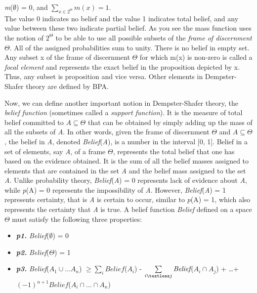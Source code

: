 \documentclass[11pt]{article}
\begin{document}
\textit{m}($\emptyset$) = 0, and $\sum\limits_{x\in2^\Theta}m(x) =1$.\\

The value 0 indicates no belief and the value 1 indicates total belief, and
any value between these two indicate partial belief. As you see the mass
function uses the notion of $2^\Theta$ to be able to use all possible subsets of
the \textit{frame of discernment} $\Theta$. All of the assigned probabilities
sum to unity. There is no belief in empty set. Any subset x of the frame of
discernment $\Theta$ for which m(x) is non-zero is called a \textit{focal
element} and represents the exact belief in the proposition depicted by x. Thus,
any subset is proposition and vice versa. Other elements in Dempster-Shafer
theory are defined by BPA. 

Now, we can define another important notion in Dempster-Shafer theory, the
\textit{belief function} (sometimes called a \textit{support function}). It is
the measure of total belief committed to $A \subseteq \Theta$ that can be
obtained by simply adding up the mass of all the subsets of \textit{A}. In other
words, given the frame of discernment $\Theta$ and $A \subseteq \Theta$, the
belief in \textit{A}, denoted \textit{Belief}(\textit{A}), is a number in the
interval [0, 1]. Belief in a set of elements, say \textit{A}, of a frame
$\Theta$, represents the total belief that one has based on the evidence
obtained. It is the sum of all the belief masses assigned to elements that are
contained in the set \textit{A} and the belief mass assigned to the set
\textit{A}. Unlike probability theory, \textit{Belief}(\textit{A}) = 0
represents lack of evidence about \textit{A}, while \textit{p}(A) = 0 represents
the impossibility of \textit{A}. However, \textit{Belief}(\textit{A}) = 1
represents certainty, that is \textit{A} is certain to occur, similar to
\textit{p}(A) = 1, which also represents the certainty that \textit{A} is true.
A belief function \textit{Belief} defined on a space $\Theta$ must satisfy the
following three properties:

\begin{itemize}
	\item[]\textit{\textbf{p1.}} \textit{Belief}($\emptyset$) = 0
	\item[]\textit{\textbf{p2.}} \textit{Belief}($\Theta$) = 1
	\item[]\textit{\textbf{p3.}} \small\textit{Belief}($A_1 \cup \ldots A_n$)
	$\geq \sum\limits_i\textit{Belief}$($A_i$) - $\sum\limits_{i \textless
	j}\textit{Belief}$($A_i \cap A_j$) + \ldots +\\
	$(-1)^{n+1}\textit{Belief}$($A_i \cap \ldots \cap A_n$)\\ \\
\end{itemize}
\end{document}
